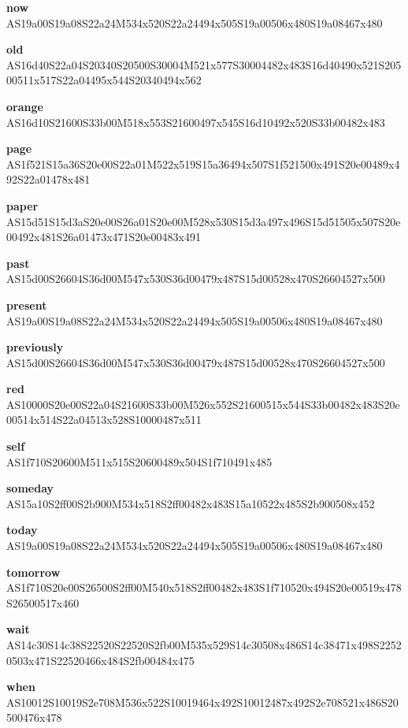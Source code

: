 \documentclass{article}
\begin{document}
\begin{glossary}
\textbf{now}\\
AS19a00S19a08S22a24M534x520S22a24494x505S19a00506x480S19a08467x480

\textbf{old}\\
AS16d40S22a04S20340S20500S30004M521x577S30004482x483S16d40490x521S20500511x517S22a04495x544S20340494x562

\textbf{orange}\\
AS16d10S21600S33b00M518x553S21600497x545S16d10492x520S33b00482x483

\textbf{page}\\
AS1f521S15a36S20e00S22a01M522x519S15a36494x507S1f521500x491S20e00489x492S22a01478x481

\textbf{paper}\\
AS15d51S15d3aS20e00S26a01S20e00M528x530S15d3a497x496S15d51505x507S20e00492x481S26a01473x471S20e00483x491

\textbf{past}\\
AS15d00S26604S36d00M547x530S36d00479x487S15d00528x470S26604527x500

\textbf{present}\\
AS19a00S19a08S22a24M534x520S22a24494x505S19a00506x480S19a08467x480

\textbf{previously}\\
AS15d00S26604S36d00M547x530S36d00479x487S15d00528x470S26604527x500

\textbf{red}\\
AS10000S20e00S22a04S21600S33b00M526x552S21600515x544S33b00482x483S20e00514x514S22a04513x528S10000487x511

\textbf{self}\\
AS1f710S20600M511x515S20600489x504S1f710491x485

\textbf{someday}\\
AS15a10S2ff00S2b900M534x518S2ff00482x483S15a10522x485S2b900508x452

\textbf{today}\\
AS19a00S19a08S22a24M534x520S22a24494x505S19a00506x480S19a08467x480

\textbf{tomorrow}\\
AS1f710S20e00S26500S2ff00M540x518S2ff00482x483S1f710520x494S20e00519x478S26500517x460

\textbf{wait}\\
AS14c30S14c38S22520S22520S2fb00M535x529S14c30508x486S14c38471x498S22520503x471S22520466x484S2fb00484x475

\textbf{when}\\
AS10012S10019S2e708M536x522S10019464x492S10012487x492S2e708521x486S20500476x478


\end{glossary}
\end{document}
